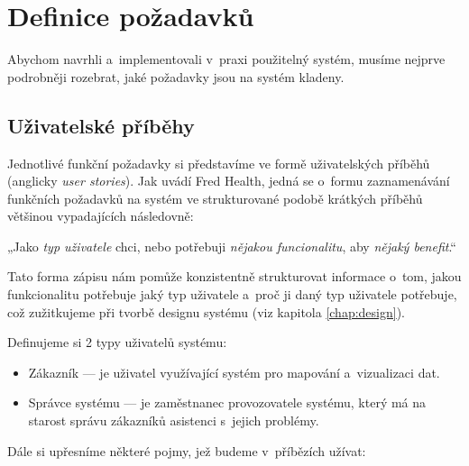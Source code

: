 
\chapter{Definice požadavků}\label{chap:requirements}

Abychom navrhli a~implementovali v~praxi použitelný systém, musíme nejprve podrobněji rozebrat, jaké požadavky jsou na systém kladeny. 

\section{Uživatelské příběhy}

Jednotlivé funkční požadavky si představíme ve formě uživatelských příběhů (anglicky \textit{user stories}).
Jak uvádí Fred Health, jedná se o~formu zaznamenávání funkčních požadavků na systém ve strukturované podobě krátkých příběhů většinou vypadajících následovně: 

„Jako \textit{typ uživatele} chci, nebo potřebuji \textit{nějakou funcionalitu}, aby \textit{nějaký benefit}.“\cite{userStories}  

Tato forma zápisu nám pomůže konzistentně strukturovat informace o~tom, jakou funkcionalitu potřebuje jaký typ uživatele a~proč ji daný typ uživatele potřebuje, což zužitkujeme při tvorbě designu systému (viz kapitola \ref{chap:design}).

Definujeme si 2 typy uživatelů systému:

\begin{itemize}
    \item Zákazník — je uživatel využívající systém pro mapování a~vizualizaci dat.
    \item Správce systému — je zaměstnanec provozovatele systému, který má na starost správu zákazníků asistenci s~jejich problémy.
\end{itemize}

Dále si upřesníme některé pojmy, jež budeme v~příbězích užívat:

